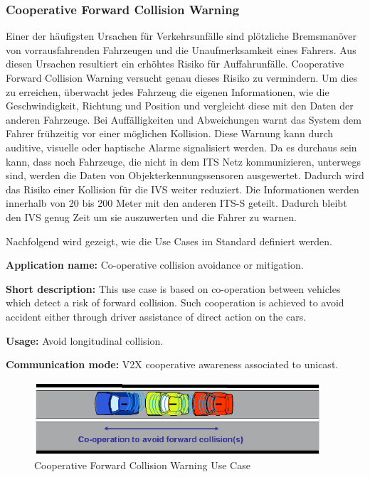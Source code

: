 \subsubsection{Cooperative Forward Collision Warning}
Einer der häufigsten Ursachen für Verkehrsunfälle sind plötzliche Bremsmanöver von vorrausfahrenden Fahrzeugen und die Unaufmerksamkeit eines Fahrers. Aus diesen Ursachen resultiert ein erhöhtes Risiko für Auffahrunfälle. Cooperative Forward Collision Warning versucht genau dieses Risiko zu vermindern. Um dies zu erreichen, überwacht jedes Fahrzeug die eigenen Informationen, wie die Geschwindigkeit, Richtung und Position und vergleicht diese mit den Daten der anderen Fahrzeuge. Bei Auffälligkeiten und Abweichungen warnt das System dem Fahrer frühzeitig vor einer möglichen Kollision. Diese Warnung kann durch auditive, visuelle oder haptische Alarme signalisiert werden. Da es durchaus sein kann, dass noch Fahrzeuge, die nicht in dem \ac{ITS} Netz kommunizieren, unterwegs sind, werden die Daten von Objekterkennungssensoren ausgewertet. Dadurch wird das Risiko einer Kollision für die \ac{IVS} weiter reduziert. Die Informationen werden innerhalb von 20 bis 200 Meter mit den anderen \ac{ITS-S} geteilt. Dadurch bleibt den \ac{IVS} genug Zeit um sie auszuwerten und die Fahrer zu warnen.


Nachfolgend wird gezeigt, wie die Use Cases im Standard definiert werden.


\textbf{Application name:} Co-operative collision avoidance or mitigation.

\textbf{Short description:} This use case is based on co-operation between vehicles which detect a risk of forward collision.
Such co\-operation is achieved to avoid accident either through driver assistance of direct action on the cars.

\textbf{Usage:} Avoid longitudinal collision.

\textbf{Communication mode:} V2X co\-operative awareness associated to unicast.

\begin{figure}[htbp]
\includegraphics[width=0.95\textwidth]{content/images/06_use_cases/colissionwarning.png}
\caption{Cooperative Forward Collision Warning Use Case \cite{etsi102638}}
\label{fig:cfcw}
\end{figure}

